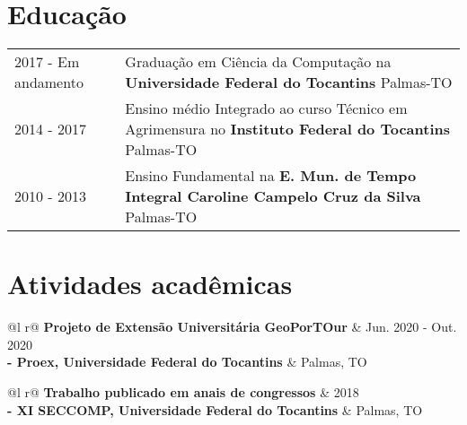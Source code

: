 \documentclass[a4paper,12pt]{article}
\begin{document}
\section{Educação}
\begin{tabularx}{\linewidth}{@{}l X@{}}	
2017 - Em andamento & Graduação em Ciência da Computação na \textbf{Universidade Federal do Tocantins} \hfill Palmas-TO \\

2014 - 2017 & Ensino médio Integrado ao curso Técnico em Agrimensura no \textbf{Instituto Federal do Tocantins} \hfill Palmas-TO \\ 

2010 - 2013 & Ensino Fundamental na \textbf{E. Mun. de Tempo Integral Caroline Campelo Cruz da Silva} \hfill Palmas-TO \\ 
\end{tabularx}


\section{Atividades acadêmicas}

\begin{tabularx}{\linewidth}{ @{}l r@{} }
\textbf{Projeto de Extensão Universitária GeoPorTOur} & \hfill Jun. 2020 - Out. 2020 \\
\textbf{- Proex, Universidade Federal do Tocantins}  & \hfill Palmas, TO\\[3.75pt]
\end{tabularx}

\begin{tabularx}{\linewidth}{ @{}l r@{} }
\textbf{Trabalho publicado em anais de congressos} & \hfill 2018 \\
\textbf{- XI SECCOMP, Universidade Federal do Tocantins}  & \hfill Palmas, TO\\[3.75pt]
\end{tabularx}
\end{document}
